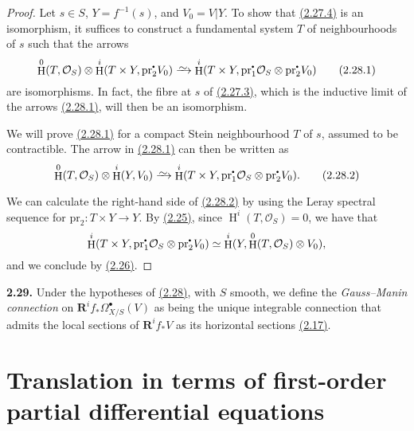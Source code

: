 \documentclass{report}
\newenvironment{rmenv}[1]
  {\phantomsection\par\medskip\noindent\textbf{#1.}\rmfamily}
  {\par\medskip}
\renewcommand{\cal}[1]{{\mathcal{#1}}}
\newcommand{\sbullet}{{\mathbin{\vcenter{\hbox{\scalebox{.5}{$\bullet$}}}}}}
\newcommand{\pr}{\mathrm{pr}}
\newcommand{\RR}{\mathbf{R}}
\newcommand{\simto}{\xrightarrow{\raisebox{-0.7ex}[0ex][0ex]{$\sim$}}}
\DeclareMathOperator{\HH}{H}
\newcommand{\oldpage}[1]{\marginpar{\footnotesize$\Big\vert$ \textit{p.~#1}}}
\begin{document}
\begin{proof}
  Let $s\in S$, $Y=f^{-1}(s)$, and $V_0=V|Y$.
  To show that \hyperref[I.2.27.4]{(2.27.4)} is an isomorphism, it suffices to construct a fundamental system $T$ of neighbourhoods of $s$ such that the arrows
  \[
  \label{I.2.28.1}
    \HH^0(T,\cal{O}_S) \otimes \HH^i(T\times Y,\pr_2^\sbullet V_0) \simto \HH^i(T\times Y,\pr_1^\sbullet\cal{O}_S \otimes \pr_2^\sbullet V_0)
  \tag{2.28.1}
  \]
  are isomorphisms.
  In fact, the fibre at $s$ of \hyperref[I.2.27.3]{(2.27.3)}, which is the inductive limit of the arrows \hyperref[I.2.28.1]{(2.28.1)}, will then be an isomorphism.

  We will prove \hyperref[I.2.28.1]{(2.28.1)} for a compact Stein neighbourhood $T$ of $s$, assumed to be contractible.
  The arrow in \hyperref[I.2.28.1]{(2.28.1)} can then be written as
\oldpage{21}
  \[
  \label{I.2.28.2}
    \HH^0(T,\cal{O}_S) \otimes \HH^i(Y,V_0) \simto \HH^i(T\times Y,\pr_1^\sbullet\cal{O}_S \otimes \pr_2^\sbullet V_0).
  \tag{2.28.2}
  \]

  We can calculate the right-hand side of \hyperref[I.2.28.2]{(2.28.2)} by using the Leray spectral sequence for $\pr_2\colon T\times Y\to Y$.
  By \hyperref[I.2.25]{(2.25)}, since $\HH^i(T,\cal{O}_S)=0$, we have that
  \[
    \HH^i(T\times Y,\pr_1^\sbullet\cal{O}_S \otimes \pr_2^\sbullet V_0) \simeq \HH^i(Y,\HH^0(T,\cal{O}_S) \otimes V_0),
  \]
  and we conclude by \hyperref[I.2.26]{(2.26)}.
\end{proof}

\begin{rmenv}{2.29}
\label{I.2.29}
  Under the hypotheses of \hyperref[I.2.28]{(2.28)}, with $S$ smooth, we define the \emph{Gauss--Manin connection} on $\RR^i f_*\Omega_{X/S}^\bullet(V)$ as being the unique integrable connection that admits the local sections of $\RR^i f_*V$ as its horizontal sections \hyperref[I.2.17]{(2.17)}.
\end{rmenv}



\section{Translation in terms of first-order partial differential equations}
\label{I.3}
\end{document}

